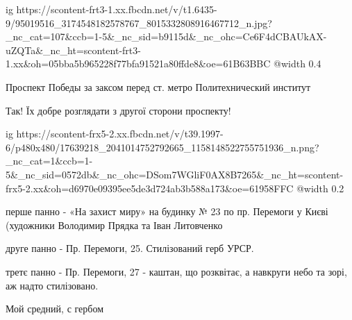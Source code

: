  
 
 
 
 

\ifcmt
  ig https://scontent-frt3-1.xx.fbcdn.net/v/t1.6435-9/95019516_3174548182578767_8015332808916467712_n.jpg?_nc_cat=107&ccb=1-5&_nc_sid=b9115d&_nc_ohc=Ce6F4dCBAUkAX-uZQTa&_nc_ht=scontent-frt3-1.xx&oh=05bba5b965228f77bfa91521a80ffde8&oe=61B63BBC
  @width 0.4
\fi

Проспект Победы за заксом перед ст. метро Политехнический институт

Так! Їх добре розглядати з другої сторони проспекту!


\ifcmt
  ig https://scontent-frx5-2.xx.fbcdn.net/v/t39.1997-6/p480x480/17639218_2041014752792665_1158148522755751936_n.png?_nc_cat=1&ccb=1-5&_nc_sid=0572db&_nc_ohc=DSom7WGliF0AX8B7265&_nc_ht=scontent-frx5-2.xx&oh=d6970e09395ee5de3d724ab3b588a173&oe=61958FFC
  @width 0.2
\fi

перше панно - «На захист миру» на будинку № 23 по пр. Перемоги у Києві (художники Володимир Прядка та Іван Литовченко

друге панно - Пр. Перемоги, 25. Стилізований герб УРСР.

третє панно - Пр. Перемоги, 27 - каштан, що розквітає, а навкруги небо та зорі, аж надто стилізовано.

Мой средний, с гербом
